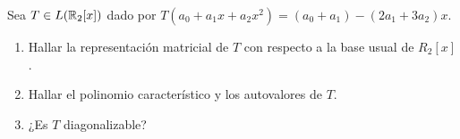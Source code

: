 \item Sea $T\in L(\mathbb{R}_2[x])$ dado por $T(a_0+a_1x+a_2x^2)=(a_0+a_1)-(2a_1+3a_2)x$.
    \begin{enumerate}
        \item Hallar la representación matricial de $T$ con respecto a la base usual de $R_2[x]$.
            \begin{mdframed}[style=s]
                
            \end{mdframed}
        \item Hallar el polinomio característico y los autovalores de $T$.
            \begin{mdframed}[style=s]
                
            \end{mdframed}
        \item ¿Es $T$ diagonalizable?
            \begin{mdframed}[style=s]
                
            \end{mdframed}
    \end{enumerate}